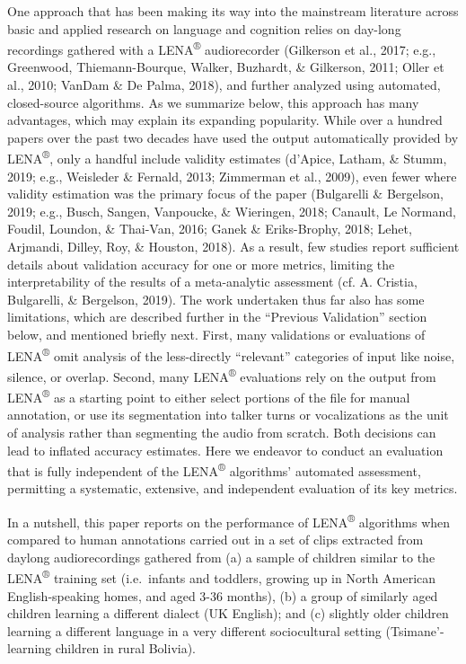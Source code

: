 \documentclass[english,table,man,floatsintext]{apa6}
\begin{document}
One approach that has been making its way into the mainstream literature
across basic and applied research on language and cognition relies on
day-long recordings gathered with a LENA\textsuperscript{®}
audiorecorder (Gilkerson et al., 2017; e.g., Greenwood,
Thiemann-Bourque, Walker, Buzhardt, \& Gilkerson, 2011; Oller et al.,
2010; VanDam \& De Palma, 2018), and further analyzed using automated,
closed-source algorithms. As we summarize below, this approach has many
advantages, which may explain its expanding popularity. While over a
hundred papers over the past two decades have used the output
automatically provided by LENA\textsuperscript{®}, only a handful
include validity estimates (d'Apice, Latham, \& Stumm, 2019; e.g.,
Weisleder \& Fernald, 2013; Zimmerman et al., 2009), even fewer where
validity estimation was the primary focus of the paper (Bulgarelli \&
Bergelson, 2019; e.g., Busch, Sangen, Vanpoucke, \& Wieringen, 2018;
Canault, Le Normand, Foudil, Loundon, \& Thai-Van, 2016; Ganek \&
Eriks-Brophy, 2018; Lehet, Arjmandi, Dilley, Roy, \& Houston, 2018). As
a result, few studies report sufficient details about validation
accuracy for one or more metrics, limiting the interpretability of the
results of a meta-analytic assessment (cf. A. Cristia, Bulgarelli, \&
Bergelson, 2019). The work undertaken thus far also has some
limitations, which are described further in the \enquote{Previous
Validation} section below, and mentioned briefly next. First, many
validations or evaluations of LENA\textsuperscript{®} omit analysis of
the less-directly \enquote{relevant} categories of input like noise,
silence, or overlap. Second, many LENA\textsuperscript{®} evaluations
rely on the output from LENA\textsuperscript{®} as a starting point to
either select portions of the file for manual annotation, or use its
segmentation into talker turns or vocalizations as the unit of analysis
rather than segmenting the audio from scratch. Both decisions can lead
to inflated accuracy estimates. Here we endeavor to conduct an
evaluation that is fully independent of the LENA\textsuperscript{®}
algorithms' automated assessment, permitting a systematic, extensive,
and independent evaluation of its key metrics.

In a nutshell, this paper reports on the performance of
LENA\textsuperscript{®} algorithms when compared to human annotations
carried out in a set of clips extracted from daylong audiorecordings
gathered from (a) a sample of children similar to the
LENA\textsuperscript{®} training set (i.e.~infants and toddlers, growing
up in North American English-speaking homes, and aged 3-36 months), (b)
a group of similarly aged children learning a different dialect (UK
English); and (c) slightly older children learning a different language
in a very different sociocultural setting (Tsimane'-learning children in
rural Bolivia).
\end{document}
